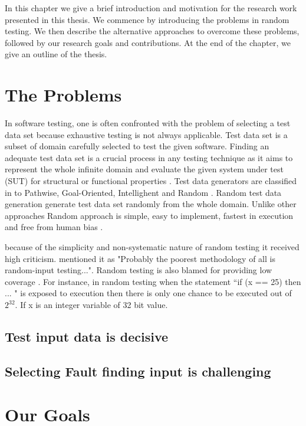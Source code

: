 In this chapter we give a brief introduction and motivation for the research work presented in this thesis. We commence by introducing the problems in random testing. We then describe the alternative approaches to overcome these problems, followed by our research goals and contributions. At the end of the chapter, we give an outline of the thesis.

\section{The Problems}
In software testing, one is often confronted with the problem of selecting a test data set because exhaustive testing is not always applicable. Test data set is a subset of domain carefully selected to test the given software. Finding an adequate test data set is a crucial process in any testing technique as it aims to represent the whole infinite domain and evaluate the given system under test (SUT) for structural or functional properties \cite{mccabe1983}. Test data generators are classified in to Pathwise, Goal-Oriented, Intellighent and Random \cite{wiki2013}. Random test data generation generate test data set randomly from the whole domain. Unlike other approaches Random approach is simple, easy to implement, fastest in execution and free from human bias \cite{Ciupa2007}. 



because of the simplicity and non-systematic nature of random testing it received high criticism. \cite{Myers2004} mentioned it as "Probably the poorest methodology of all is random-input testing...". Random testing is also blamed for providing low coverage \cite{Offutt1996}. For instance, in random testing when the statement  ``if (x == 25) then ... "  is exposed to execution then there is only one chance to be executed out of $2^\text{32}$. If x is an integer variable of 32 bit value. \cite{Godefroid2005}


\subsection{Test input data is decisive}
\subsection{Selecting Fault finding input is challenging}

\section{Our Goals}

